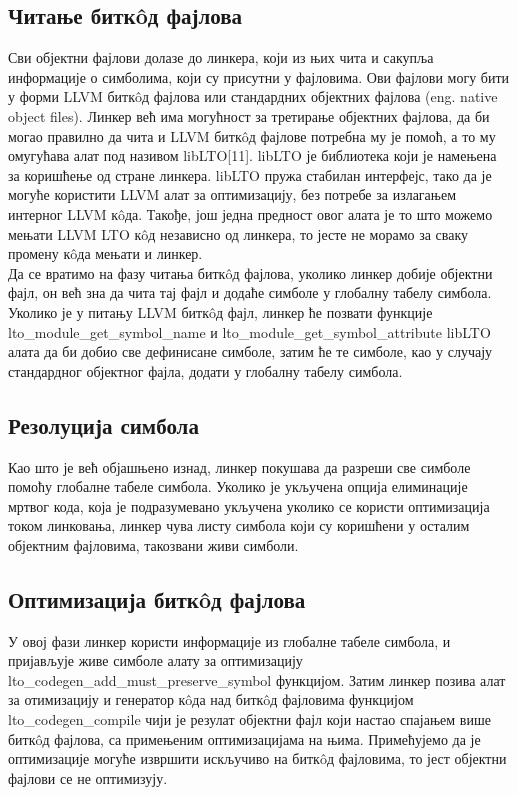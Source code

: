 \documentclass[12pt,oneside]{memoir}
\begin{document}
\subsection{Читање битк\^{o}д фајлова}
Сви објектни фајлови долазе до линкера, који из њих чита и сакупља информације
о симболима, који су присутни у фајловима.
Ови фајлови могу бити у форми LLVM битк\^{o}д фајлова или стандардних објектних
фајлова (eng. native object files).
Линкер већ има могућност за третирање објектних фајлова, да би могао
правилно да чита и LLVM битк\^{o}д фајлове потребна му је помоћ, а то му омугућава
алат под називом libLTO[11].
libLTO је библиотека који је намењена за коришћење од стране линкера.
libLTO пружа стабилан интерфејс, тако да је могуће користити
LLVM алат за оптимизацију, без потребе за излагањем интерног LLVM к\^{o}да.
Такође, још једна предност овог алата је то што можемо мењати LLVM LTO к\^{o}д независно
од линкера, то јесте не морамо за сваку промену к\^{o}да мењати и линкер.
\\
Да се вратимо на фазу читања битк\^{o}д фајлова, уколико линкер добије
објектни фајл, он већ зна да чита тај фајл и додаће симболе у глобалну табелу симбола.
Уколико је у питању LLVM битк\^{o}д фајл, линкер ће позвати функције \\
lto{\_}module{\_}get{\_}symbol{\_}name и 
lto{\_}module{\_}get{\_}symbol{\_}attribute 
libLTO алата да би добио све дефинисане  симболе, затим ће те симболе, 
као у случају стандардног објектног фајла, додати у глобалну табелу симбола.

\subsection{Резолуција симбола}
Као што је већ објашњено изнад, линкер покушава да разреши све симболе помоћу
глобалне табеле симбола.
Уколико је укључена опција елиминације мртвог кода, која је подразумевано укључена
уколико се користи оптимизација током линковања, линкер чува листу симбола који
су коришћени у осталим објектним фајловима, такозвани живи симболи.

\subsection{Оптимизација битк\^{o}д фајлова} 
У овој фази линкер користи информације из глобалне табеле симбола, и пријављује
живе симболе алату за оптимизацију
lto{\_}codegen{\_}add{\_}must{\_}preserve{\_}symbol функцијом.
Затим линкер позива алат за отимизацију и генератор к\^{o}да над битк\^{o}д фајловима
функцијом lto{\_}codegen{\_}compile чији је резулат објектни фајл
који настао спајањем више битк\^{o}д фајлова, са примењеним оптимизацијама на њима.
Примећујемо да је оптимизације могуће извршити искључиво на битк\^{o}д фајловима,
то јест објектни фајлови се не оптимизују.
\end{document}
